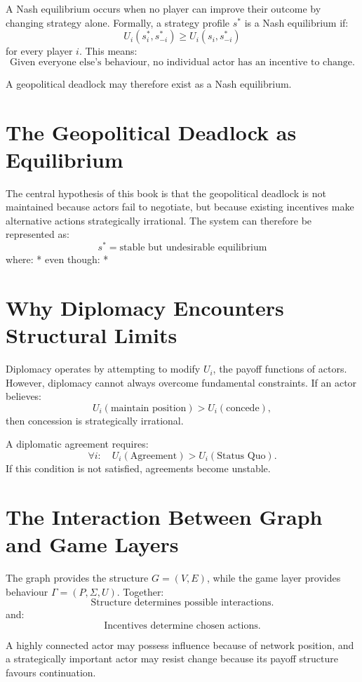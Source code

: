 \documentclass[11pt,openany]{book}
\theoremstyle{plain}
\theoremstyle{definition}
\begin{document}
A Nash equilibrium occurs when no player can improve their outcome by changing strategy alone. Formally, a strategy profile \(s^*\) is a Nash equilibrium if:
\[
U_i(s_i^*, s_{-i}^*) \geq U_i(s_i, s_{-i}^*)
\]
for every player \(i\). This means:
\[
\boxed{
\text{Given everyone else's behaviour, no individual actor has an incentive to change.}
}
\]

A geopolitical deadlock may therefore exist as a Nash equilibrium.

\section*{The Geopolitical Deadlock as Equilibrium}

The central hypothesis of this book is that the geopolitical deadlock is not maintained because actors fail to negotiate, but because existing incentives make alternative actions strategically irrational. The system can therefore be represented as:
\[
s^* = \text{stable but undesirable equilibrium}
\]
where:
* 
even though:
* 

\section*{Why Diplomacy Encounters Structural Limits}

Diplomacy operates by attempting to modify \(U_i\), the payoff functions of actors. However, diplomacy cannot always overcome fundamental constraints. If an actor believes:
\[
U_i(\text{maintain position}) > U_i(\text{concede}),
\]
then concession is strategically irrational. 

A diplomatic agreement requires:
\[
\forall i: \quad U_i(\text{Agreement}) > U_i(\text{Status Quo}).
\]
If this condition is not satisfied, agreements become unstable.

\section*{The Interaction Between Graph and Game Layers}

The graph provides the structure \(G = (V, E)\), while the game layer provides behaviour \(\Gamma=(P,\Sigma,U)\). Together:
\[
\boxed{
\text{Structure determines possible interactions.}
}
\]
and:
\[
\boxed{
\text{Incentives determine chosen actions.}
}
\]

A highly connected actor may possess influence because of network position, and a strategically important actor may resist change because its payoff structure favours continuation.
\end{document}
